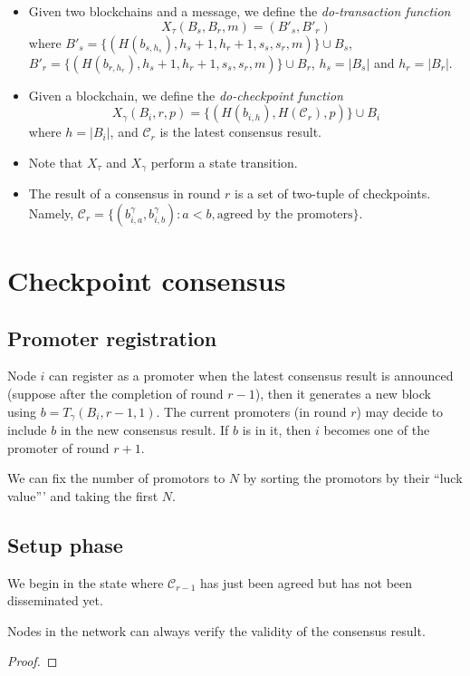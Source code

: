 \begin{itemize}
\item Given two blockchains and a message, we define the \emph{do-transaction
    function}
  $$X_\tau(B_s, B_r, m) = (B'_s, B'_r)$$
  where $B'_s = \{(H(b_{s,h_s}), h_s + 1, h_r + 1, s_s, s_r, m)\} \cup B_s$,
  $B'_r = \{(H(b_{r, h_r}), h_s + 1, h_r + 1, s_s, s_r, m)\} \cup B_r$, $h_s =
  |B_s|$ and $h_r = |B_r|$.

\item Given a blockchain, we define the \emph{do-checkpoint function}
  $$X_\gamma(B_i, r, p) = \{ (H(b_{i,h}), H(\mathcal{C}_r), p) \}\cup B_i$$ where
  $h = |B_i|$, and $\mathcal{C}_r$ is the latest consensus result.

\item Note that $X_\tau$ and $X_\gamma$ perform a state transition.

\item The result of a consensus in round $r$ is a set of two-tuple of
  checkpoints. Namely, $\mathcal{C}_r = \{ (b^\gamma_{i,a}, b^\gamma_{i,b}) : a
  < b, \text{agreed by the promoters}\}$.
\end{itemize}

\section{Checkpoint consensus}

\subsection{Promoter registration}
Node $i$ can register as a promoter when the latest consensus result is
announced (suppose after the completion of round $r-1$), then it generates a new
block using $b = T_\gamma(B_i, r-1, 1)$. The current promoters (in round $r$)
may decide to include $b$ in the new consensus result. If $b$ is in it, then $i$
becomes one of the promoter of round $r+1$.

We can fix the number of promotors to $N$ by sorting the promotors by their
``luck value''' and taking the first $N$.

\subsection{Setup phase}
We begin in the state where $\mathcal{C}_{r-1}$ has just been agreed but has not
been disseminated yet.
\begin{lemma}
  Nodes in the network can always verify the validity of the consensus result.
\end{lemma}
\begin{proof}
\end{proof}


